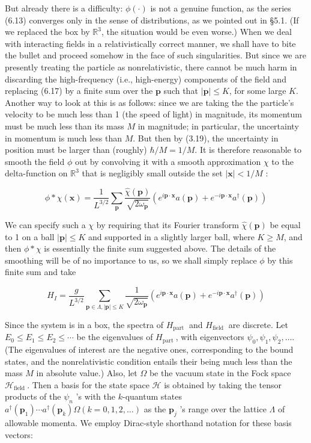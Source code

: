 \documentclass[10pt, letterpaper]{article}
\begin{document}
But already there is a difficulty: $\phi(\cdot)$ is not a genuine function, as the series (6.13) converges only in the sense of distributions, as we pointed out in §5.1. (If we replaced the box by $\mathbb{R}^{3}$, the situation would be even worse.) When we deal with interacting fields in a relativistically correct manner, we shall have to bite the bullet and proceed somehow in the face of such singularities. But since we are presently treating the particle as nonrelativistic, there cannot be much harm in discarding the high-frequency (i.e., high-energy) components of the field and replacing (6.17) by a finite sum over the $\mathbf{p}$ such that $|\mathbf{p}| \leq K$, for some large $K$. Another way to look at this is as follows: since we are taking the the particle's velocity to be much less than 1 (the speed of light) in magnitude, its momentum must be much less than its mass $M$ in magnitude; in particular, the uncertainty in momentum is much less than $M$. But then by (3.19), the uncertainty in position must be larger than (roughly) $\hbar / M=1 / M$. It is therefore reasonable to smooth the field $\phi$ out by convolving it with a smooth approximation $\chi$ to the delta-function on $\mathbb{R}^{3}$ that is negligibly small outside the set $|\mathbf{x}|<1 / M$ :

$$
\phi * \chi(\mathbf{x})=\frac{1}{L^{3 / 2}} \sum_{\mathbf{p}} \frac{\widehat{\chi}(\mathbf{p})}{\sqrt{2 \omega_{\mathbf{p}}}}\left(e^{i \mathbf{p} \cdot \mathbf{x}} a(\mathbf{p})+e^{-i \mathbf{p} \cdot \mathbf{x}} a^{\dagger}(\mathbf{p})\right)
$$

We can specify such a $\chi$ by requiring that its Fourier transform $\widehat{\chi}(\mathbf{p})$ be equal to 1 on a ball $|\mathbf{p}| \leq K$ and supported in a slightly larger ball, where $K \geq M$, and then $\phi * \chi$ is essentially the finite sum suggested above. The details of the smoothing will be of no importance to us, so we shall simply replace $\phi$ by this finite sum and take

$$
H_{I}=\frac{g}{L^{3 / 2}} \sum_{\mathbf{p} \in \Lambda,|\mathbf{p}| \leq K} \frac{1}{\sqrt{2 \omega_{\mathbf{p}}}}\left(e^{i \mathbf{p} \cdot \mathbf{x}} a(\mathbf{p})+e^{-i \mathbf{p} \cdot \mathbf{x}} a^{\dagger}(\mathbf{p})\right)
$$

Since the system is in a box, the spectra of $H_{\text {part }}$ and $H_{\text {field }}$ are discrete. Let $E_{0} \leq E_{1} \leq E_{2} \leq \cdots$ be the eigenvalues of $H_{\text {part }}$, with eigenvectors $\psi_{0}, \psi_{1}, \psi_{2}, \ldots$. (The eigenvalues of interest are the negative ones, corresponding to the bound states, and the nonrelativistic condition entails their being much less than the mass $M$ in absolute value.) Also, let $\Omega$ be the vacuum state in the Fock space $\mathcal{H}_{\text {field }}$. Then a basis for the state space $\mathcal{H}$ is obtained by taking the tensor products of the $\psi_{n}$ 's with the $k$-quantum states $a^{\dagger}\left(\mathbf{p}_{1}\right) \cdots a^{\dagger}\left(\mathbf{p}_{k}\right) \Omega(k=0,1,2, \ldots)$ as the $\mathbf{p}_{j}$ 's range over the lattice $\Lambda$ of allowable momenta. We employ Dirac-style shorthand notation for these basis vectors:
\end{document}
